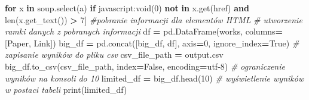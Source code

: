 \documentclass[
  12pt,
]{article}
\newenvironment{Shaded}{\begin{snugshade}}{\end{snugshade}}
\newcommand{\BuiltInTok}[1]{#1}
\newcommand{\CommentTok}[1]{\textcolor[rgb]{0.56,0.35,0.01}{\textit{#1}}}
\newcommand{\ControlFlowTok}[1]{\textcolor[rgb]{0.13,0.29,0.53}{\textbf{#1}}}
\newcommand{\DecValTok}[1]{\textcolor[rgb]{0.00,0.00,0.81}{#1}}
\newcommand{\KeywordTok}[1]{\textcolor[rgb]{0.13,0.29,0.53}{\textbf{#1}}}
\newcommand{\NormalTok}[1]{#1}
\newcommand{\OperatorTok}[1]{\textcolor[rgb]{0.81,0.36,0.00}{\textbf{#1}}}
\newcommand{\StringTok}[1]{\textcolor[rgb]{0.31,0.60,0.02}{#1}}
\newcommand{\VariableTok}[1]{\textcolor[rgb]{0.00,0.00,0.00}{#1}}
\begin{document}
\begin{Shaded}
\begin{Highlighting}[]
             \ControlFlowTok{for}\NormalTok{ x }\KeywordTok{in}\NormalTok{ soup.select(}\StringTok{\textquotesingle{}a\textquotesingle{}}\NormalTok{) }\ControlFlowTok{if} \StringTok{\textquotesingle{}javascript:void(0)\textquotesingle{}} \KeywordTok{not} \KeywordTok{in}\NormalTok{ x.get(}\StringTok{\textquotesingle{}href\textquotesingle{}}\NormalTok{)}
             \KeywordTok{and} \BuiltInTok{len}\NormalTok{(x.get\_text()) }\OperatorTok{\textgreater{}} \DecValTok{7}\NormalTok{] }\CommentTok{\#pobranie informacji dla elementów HTML}
\CommentTok{\# utworzenie ramki danych z pobranych informacji}
\NormalTok{    df }\OperatorTok{=}\NormalTok{ pd.DataFrame(works, columns}\OperatorTok{=}\NormalTok{[}\StringTok{\textquotesingle{}Paper\textquotesingle{}}\NormalTok{, }\StringTok{\textquotesingle{}Link\textquotesingle{}}\NormalTok{])}
\NormalTok{    big\_df }\OperatorTok{=}\NormalTok{ pd.concat([big\_df, df], axis}\OperatorTok{=}\DecValTok{0}\NormalTok{, ignore\_index}\OperatorTok{=}\VariableTok{True}\NormalTok{)}
\CommentTok{\# zapisanie wyników do pliku csv}
\NormalTok{csv\_file\_path }\OperatorTok{=} \StringTok{\textquotesingle{}output.csv\textquotesingle{}}
\NormalTok{big\_df.to\_csv(csv\_file\_path, index}\OperatorTok{=}\VariableTok{False}\NormalTok{, encoding}\OperatorTok{=}\StringTok{\textquotesingle{}utf{-}8\textquotesingle{}}\NormalTok{)}
\CommentTok{\# ograniczenie wyników na konsoli do 10}
\NormalTok{limited\_df }\OperatorTok{=}\NormalTok{ big\_df.head(}\DecValTok{10}\NormalTok{)}
\CommentTok{\# wyświetlenie wyników w postaci tabeli}
\BuiltInTok{print}\NormalTok{(limited\_df)}
\end{Highlighting}
\end{Shaded}
\end{document}
